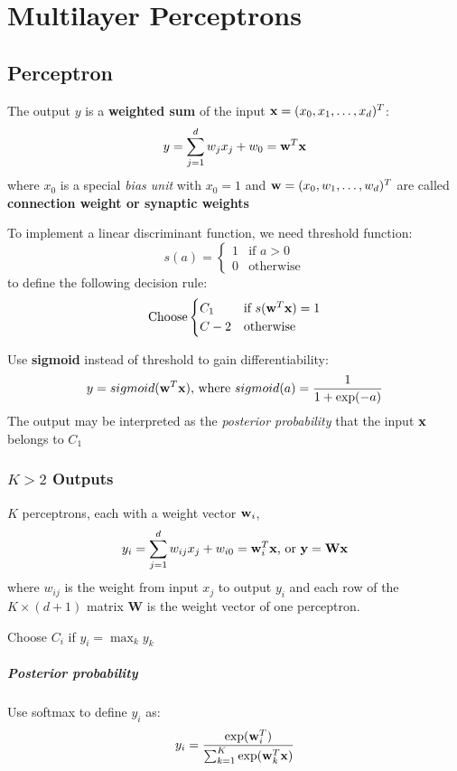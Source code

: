 \chapter{Multilayer Perceptrons}
\section{Perceptron}
    The output $y$ is a \textbf{weighted sum} of the input $\mathbf{x}
        = (x_0,x_1,\dots, x_d)^T$:
        \[y = \sum^d_{j=1}w_j x_j + w_0 = \mathbf{w}^T\mathbf{x} \]
        where $x_0$ is a special \emph{bias unit} with $x_0 = 1$ and $\mathbf{w} =
        (x_0, w_1, \dots, w_d)^T$ are called \textbf{connection weight or
        synaptic weights}

    To implement a linear discriminant function, we need threshold
        function:
        \[ s(a) = \begin{cases} 1 & \mbox{if } a> 0 \\
                0 & \mbox{otherwise} \end{cases}
        \]
        to define the following decision rule:
        \[
            \mbox{Choose}
            \begin{cases}
                C_1 & \mbox{if } s(\mathbf{w}^T\mathbf{x})  = 1 \\
                C-2 & \mbox{otherwise}
            \end{cases}
        \]

    Use \textbf{sigmoid} instead of threshold to gain differentiability:
        \[y =sigmoid(\mathbf{w}^T\mathbf{x})\mbox{, where } sigmoid(a) = \frac{1}{1+\exp(-a)}
        \]
        The output may be interpreted as the \emph{posterior probability}
        that the input $\mathbf{x}$ belongs to $C_1$

    \subsection{$K>2$ Outputs} $K$ perceptrons, each with a weight vector $\mathbf{w}_i$, 
        \[ y_i = \sum_{j=1}^d w_{ij}x_j + w_{i0} = \mathbf{w}_i^T\mathbf{x} \mbox{, or }
            \mathbf{y} = \mathbf{W}\mathbf{x} \]
        where $w_{ij}$ is the weight from input $x_j$ to output $y_i$ and
        each row of the $K\times(d+1)$ matrix $\mathbf{W}$ is the weight
        vector of one perceptron. 

    Choose $C_i$ if $y_i = \max_{k} y_k$

    \paragraph{Posterior probability}
    Use softmax to define $y_i$ as:
        \[ y_i = \frac{\exp(\mathbf{w}_i^T)}{\sum_{k=1}^K \exp(\mathbf{w}_k^T\mathbf{x})} \]
